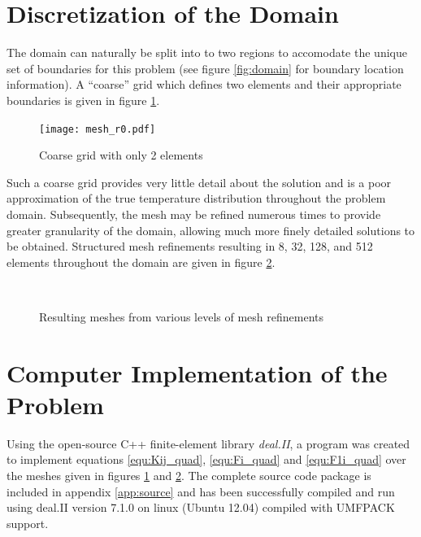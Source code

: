 \documentclass[letterpaper,10pt]{article}
\begin{document}
\section{Discretization of the Domain}
The domain can naturally be split into to two regions to accomodate the unique set of boundaries for this problem (see figure \ref{fig:domain} for boundary location information). A ``coarse'' grid which defines two elements and their appropriate boundaries is given in figure \ref{fig:grid_r0}.

\begin{figure}[H]
	\centering
	\texttt{[image: mesh\_r0.pdf]}
	\caption{Coarse grid with only 2 elements}
	\label{fig:grid_r0}
\end{figure}

Such a coarse grid provides very little detail about the solution and is a poor approximation of the true temperature distribution throughout the problem domain. Subsequently, the mesh may be refined numerous times to provide greater granularity of the domain, allowing much more finely detailed solutions to be obtained. Structured mesh refinements resulting in 8, 32, 128, and 512 elements throughout the domain are given in figure \ref{fig:meshs}.

\begin{figure}[H]
	\centering
	 \;
	 \\
	 \;
	\caption{Resulting meshes from various levels of mesh refinements}
	\label{fig:meshs}
\end{figure}

\section{Computer Implementation of the Problem}
Using the open-source C++ finite-element library \emph{deal.II}, a program was created to implement equations \ref{equ:Kij_quad}, \ref{equ:Fi_quad} and \ref{equ:F1i_quad} over the meshes given in figures \ref{fig:grid_r0} and \ref{fig:meshs}. The complete source code package is included in appendix \ref{app:source} and has been successfully compiled and run using deal.II version 7.1.0 on linux (Ubuntu 12.04) compiled with UMFPACK support.
\end{document}
